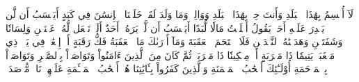 لَآ أُقۡسِمُ بِهَٰذَا ٱلۡبَلَدِ
وَأَنتَ حِلُّۢ بِهَٰذَا ٱلۡبَلَدِ
وَوَالِدٖ وَمَا وَلَدَ
لَقَدۡ خَلَقۡنَا ٱلۡإِنسَٰنَ فِي كَبَدٍ
أَيَحۡسَبُ أَن لَّن يَقۡدِرَ عَلَيۡهِ أَحَدٞ
يَقُولُ أَهۡلَكۡتُ مَالٗا لُّبَدًا
أَيَحۡسَبُ أَن لَّمۡ يَرَهُۥٓ أَحَدٌ
أَلَمۡ نَجۡعَل لَّهُۥ عَيۡنَيۡنِ
وَلِسَانٗا وَشَفَتَيۡنِ
وَهَدَيۡنَٰهُ ٱلنَّجۡدَيۡنِ
فَلَا ٱقۡتَحَمَ ٱلۡعَقَبَةَ
وَمَآ أَدۡرَىٰكَ مَا ٱلۡعَقَبَةُ
فَكُّ رَقَبَةٍ
أَوۡ إِطۡعَٰمٞ فِي يَوۡمٖ ذِي مَسۡغَبَةٖ
يَتِيمٗا ذَا مَقۡرَبَةٍ
أَوۡ مِسۡكِينٗا ذَا مَتۡرَبَةٖ
ثُمَّ كَانَ مِنَ ٱلَّذِينَ ءَامَنُواْ وَتَوَاصَوۡاْ بِٱلصَّبۡرِ وَتَوَاصَوۡاْ بِٱلۡمَرۡحَمَةِ
أُوْلَـٰٓئِكَ أَصۡحَٰبُ ٱلۡمَيۡمَنَةِ
وَٱلَّذِينَ كَفَرُواْ بِـَٔايَٰتِنَا هُمۡ أَصۡحَٰبُ ٱلۡمَشۡـَٔمَةِ
عَلَيۡهِمۡ نَارٞ مُّؤۡصَدَةُۢ